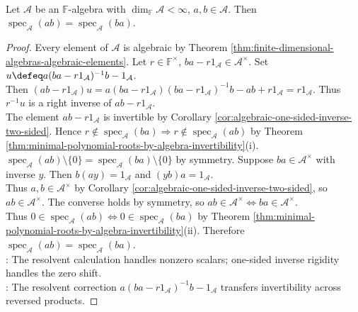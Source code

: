 \begin{proposition} \label{prop:algebra-spectra-of-ab-and-ba} \\
Let $\mathcal{A}$ be an $\mathbb{F}$-algebra with $\dim_{\mathbb{F}}\mathcal{A}<\infty$, $a,b\in\mathcal{A}$. Then $\operatorname{spec}_{\mathcal{A}}(ab)=\operatorname{spec}_{\mathcal{A}}(ba)$.
\begin{proof}
Every element of $\mathcal{A}$ is algebraic by Theorem \ref{thm:finite-dimensional-algebras-algebraic-elements}. Let $r\in\mathbb{F}^{\times}$, $ba-r1_{\mathcal{A}}\in\mathcal{A}^{\times}$. Set $u\defeq a(ba-r1_{\mathcal{A}})^{-1}b-1_{\mathcal{A}}$.\\
Then $(ab-r1_{\mathcal{A}})u=a(ba-r1_{\mathcal{A}})(ba-r1_{\mathcal{A}})^{-1}b-ab+r1_{\mathcal{A}}=r1_{\mathcal{A}}$. Thus $r^{-1}u$ is a right inverse of $ab-r1_{\mathcal{A}}$.\\
The element $ab-r1_{\mathcal{A}}$ is invertible by Corollary \ref{cor:algebraic-one-sided-inverse-two-sided}. Hence $r\notin\operatorname{spec}_{\mathcal{A}}(ba)\Rightarrow r\notin\operatorname{spec}_{\mathcal{A}}(ab)$ by Theorem \ref{thm:minimal-polynomial-roots-by-algebra-invertibility}(i).\\
$\operatorname{spec}_{\mathcal{A}}(ab)\setminus\{0\}=\operatorname{spec}_{\mathcal{A}}(ba)\setminus\{0\}$ by symmetry. Suppose $ba\in\mathcal{A}^{\times}$ with inverse $y$. Then $b(ay)=1_{\mathcal{A}}$ and $(yb)a=1_{\mathcal{A}}$.\\
Thus $a,b\in\mathcal{A}^{\times}$ by Corollary \ref{cor:algebraic-one-sided-inverse-two-sided}, so $ab\in\mathcal{A}^{\times}$. The converse holds by symmetry, so $ab\in\mathcal{A}^{\times}\Longleftrightarrow ba\in\mathcal{A}^{\times}$.\\
Thus $0\in\operatorname{spec}_{\mathcal{A}}(ab)\Longleftrightarrow0\in\operatorname{spec}_{\mathcal{A}}(ba)$ by Theorem \ref{thm:minimal-polynomial-roots-by-algebra-invertibility}(ii). Therefore $\operatorname{spec}_{\mathcal{A}}(ab)=\operatorname{spec}_{\mathcal{A}}(ba)$.\\
: The resolvent calculation handles nonzero scalars; one-sided inverse rigidity handles the zero shift.\\
: The resolvent correction $a(ba-r1_{\mathcal{A}})^{-1}b-1_{\mathcal{A}}$ transfers invertibility across reversed products.
\end{proof}
\end{proposition}
